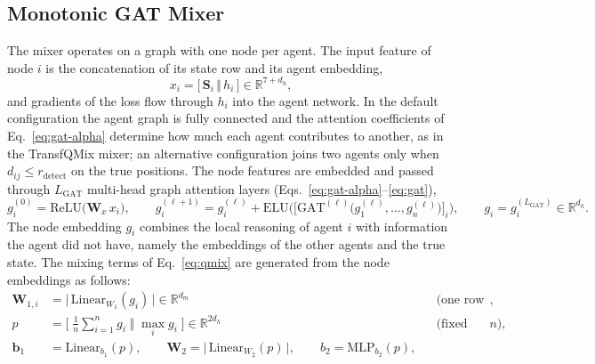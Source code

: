 \subsection{Monotonic GAT Mixer}
\label{subsec:mixer}
The mixer operates on a graph with one node per agent. The input feature of node $i$ is the
concatenation of its state row and its agent embedding,
\begin{equation}
\label{eq:mixer-input}
x_i = \big[\,\mathbf{S}_i \,\Vert\, h_i\,\big] \in \mathbb{R}^{7+d_h},
\end{equation}
and gradients of the loss flow through $h_i$ into the agent network. In the default
configuration the agent graph is fully connected and the attention coefficients of
Eq.~\eqref{eq:gat-alpha} determine how much each agent contributes to another, as in the
TransfQMix mixer; an alternative configuration joins two agents only when
$d_{ij}\le r_{\text{detect}}$ on the true positions. The node features are embedded and
passed through $L_{\text{GAT}}$ multi-head graph attention layers
(Eqs.~\eqref{eq:gat-alpha}--\eqref{eq:gat}),
\begin{equation}
\label{eq:mixer-gat}
g_i^{(0)} = \mathrm{ReLU}\big(\mathbf{W}_{x}\,x_i\big),
\qquad
g_i^{(\ell+1)} = g_i^{(\ell)} + \mathrm{ELU}\Big(\big[\mathrm{GAT}^{(\ell)}\big(g^{(\ell)}_1,\dots,g^{(\ell)}_n\big)\big]_i\Big),
\qquad
g_i = g_i^{(L_{\text{GAT}})} \in \mathbb{R}^{d_h}.
\end{equation}
The node embedding $g_i$ combines the local reasoning of agent $i$ with information the
agent did not have, namely the embeddings of the other agents and the true state. The
mixing terms of Eq.~\eqref{eq:qmix} are generated from the node embeddings as follows:
\begin{align}
\label{eq:w1}
\mathbf{W}_{1,i} &= \big|\,\mathrm{Linear}_{W_1}(g_i)\,\big| \in \mathbb{R}^{d_m}
&&\text{(one row per agent)},\\
\label{eq:readout}
p &= \Big[\;\frac{1}{n}\sum_{i=1}^{n} g_i \;\Big\Vert\; \max_{i} g_i\;\Big] \in \mathbb{R}^{2d_h}
&&\text{(fixed size for any } n\text{)},\\
\label{eq:b1w2b2}
\mathbf{b}_1 &= \mathrm{Linear}_{b_1}(p), \qquad
\mathbf{W}_2 = \big|\,\mathrm{Linear}_{W_2}(p)\,\big|, \qquad
b_2 = \mathrm{MLP}_{b_2}(p),
\end{align}
